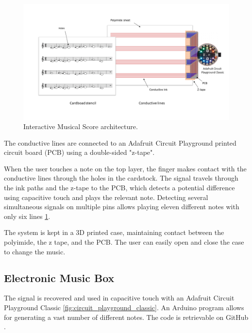 \begin{figure}[h]
   \centering
   \includegraphics{images/IS_schema.png}
   \caption{Interactive Musical Score architecture.}
   \label{fig:IS_schema}
\end{figure}

The conductive lines are connected to an Adafruit Circuit Playground printed circuit board (PCB) using a double-sided "z-tape".

When the user touches a note on the top layer, the finger makes contact with the conductive lines through the holes in the cardstock.
The signal travels through the ink paths and the z-tape to the PCB, which detects a potential difference using capacitive touch and plays the relevant note. Detecting several simultaneous signals on multiple pins allows playing eleven different notes with only six lines \ref{fig:IS_schema}.

The system is kept in a 3D printed case, maintaining contact between the polyimide, the z tape, and the PCB. The user can easily open and close the case to change the music.



\subsection{Electronic Music Box}

The signal is recovered and used in capacitive touch with an Adafruit Circuit Playground Classic \ref{fig:circuit_playground_classic}. An Arduino program allows for generating a vast number of different notes. The code is retrievable on GitHub \cite{adrien2022capacitive_to_notes}.


